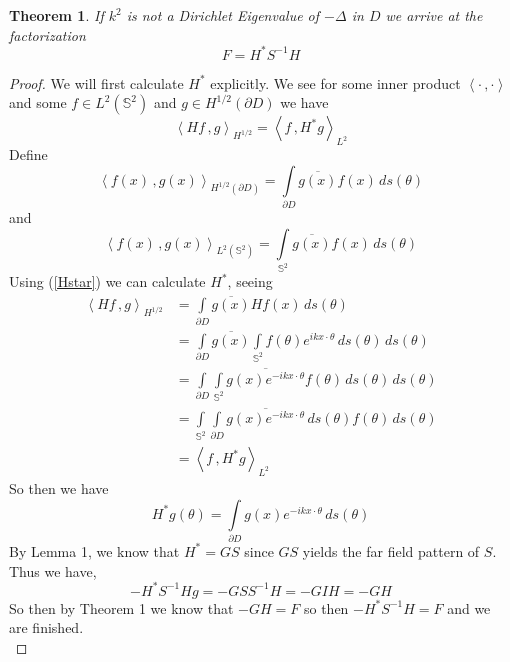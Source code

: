 \documentclass[]{article}
\newtheorem{theorem}{Theorem}
\newcommand{\innerprod}[2]{\left\langle #1\,, #2 \right\rangle}
\begin{document}
			\begin{theorem}
				If $k^2$ is not a Dirichlet Eigenvalue of $-\Delta$ in $D$ we arrive at the factorization
				\begin{equation}
					F = H^\ast S^{-1}H
				\end{equation}
			\end{theorem}
			\begin{proof}
				We will first calculate $H^\ast$ explicitly. We see for some inner product $\innerprod{\cdot}{\cdot}$ and some $f \in L^2(\mathbb S^2)$ and $g\in H^{1/2}(\partial D)$ we have 
				\begin{equation}
					\innerprod{Hf}{g}_{H^{1/2}} = \innerprod{f}{H^\ast g}_{L^2}\label{Hstar}
				\end{equation}
				Define
				\begin{equation}
					\innerprod{f(x)}{g(x)}_{H^{1/2}(\partial D)} = \int\limits_{\partial D} \overline{g(x)}f(x)\, ds(\theta)
				\end{equation}
				and
				\begin{equation}
					\innerprod{f(x)}{g(x)}_{L^2(\mathbb S^2)} = \int\limits_{\mathbb S^2}\overline{g(x)}f(x)\, ds(\theta)
				\end{equation}
				Using (\ref{Hstar}) we can calculate $H^\ast$, seeing
				\begin{align}
					\innerprod{Hf}{g}_{H^{1/2}} &=  \int\limits_{\partial D} \overline{g(x)}Hf(x)\, ds(\theta)\\
					 &=  \int\limits_{\partial D} \overline{g(x)} \int\limits_{\mathbb S^2}f(\theta)e^{ikx\cdot \theta}\, ds(\theta) \, ds(\theta)\\
					 &=  \int\limits_{\partial D}  \int\limits_{\mathbb S^2}\overline{g(x)e^{-ikx\cdot \theta}}f(\theta)\, ds(\theta) \, ds(\theta)\\
					 &=  \int\limits_{\mathbb S^2}\int\limits_{\partial D}  \overline{g(x)e^{-ikx\cdot \theta}}\, ds(\theta)f(\theta) \, ds(\theta)\\
					 &= \innerprod{f}{H^\ast g}_{L^2}
				\end{align}
				So then we have
				\begin{equation}
					H^\ast g(\theta) = \int\limits_{\partial D}g(x)e^{-ikx\cdot \theta}\, ds(\theta)
				\end{equation}
				By Lemma 1, we know that $H^\ast = GS$ since $GS$ yields the far field pattern of $S$. Thus we have,
				\begin{equation}
					 -H^\ast S^{-1}Hg = -GSS^{-1}H = -GIH = -GH
				\end{equation}
				So then by Theorem 1 we know that $-GH = F$ so then $-H^\ast S^{-1}H = F$ and we are finished.\\
			\end{proof}
\end{document}
